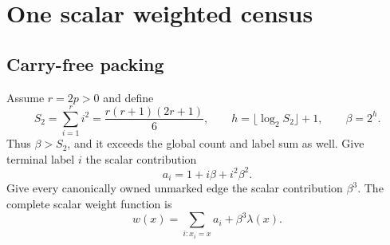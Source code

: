 \documentclass[11pt]{article}
\theoremstyle{definition}\newtheorem{definition}[theorem]{Definition}\newtheorem{example}[theorem]{Example}
\theoremstyle{remark}\newtheorem{remark}[theorem]{Remark}
\begin{document}
\section{One scalar weighted census}
\label{sec:scalar}
\subsection{Carry-free packing}
Assume $r=2p>0$ and define
\begin{equation}\label{eq:base}
 S_2=\sum_{i=1}^{r}i^2=\frac{r(r+1)(2r+1)}6,\qquad
 h=\lfloor\log_2S_2\rfloor+1,\qquad \beta=2^h.
\end{equation}
Thus $\beta>S_2$, and it exceeds the global count and label sum as well. Give terminal label $i$ the scalar contribution
\begin{equation}\label{eq:terminalweight}
                         a_i=1+i\beta+i^2\beta^2.
\end{equation}
Give every canonically owned unmarked edge the scalar contribution $\beta^3$. The complete scalar weight function is
\begin{equation}\label{eq:scalarweight}
        w(x)=\sum_{i:x_i=x}a_i+\beta^3\lambda(x).
\end{equation}
\end{document}
